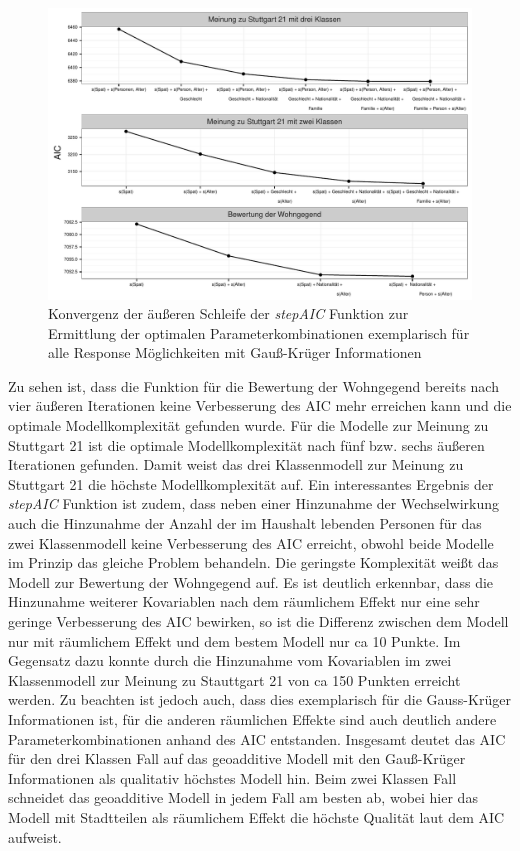 \documentclass{Vorlage}
\begin{document}
\begin{figure}[h]
 \begin{center}
 \includegraphics[scale=0.8]{Pictures/stepAIC}
 \caption{Konvergenz der äußeren Schleife der \textit{stepAIC} Funktion zur Ermittlung der optimalen Parameterkombinationen exemplarisch für alle Response Möglichkeiten mit Gauß-Krüger Informationen}
 \label{AIC}
 \end{center}
\end{figure}

Zu sehen ist, dass die Funktion für die Bewertung der Wohngegend bereits nach vier äußeren Iterationen keine Verbesserung des AIC mehr erreichen kann und die optimale Modellkomplexität gefunden wurde. Für die Modelle zur Meinung zu Stuttgart 21 ist die optimale Modellkomplexität nach fünf bzw. sechs äußeren Iterationen gefunden. Damit weist das drei Klassenmodell zur Meinung zu Stuttgart 21 die höchste Modellkomplexität auf. Ein interessantes Ergebnis der \textit{stepAIC} Funktion ist zudem, dass neben einer Hinzunahme der Wechselwirkung auch die Hinzunahme der Anzahl der im Haushalt lebenden Personen für das zwei Klassenmodell keine Verbesserung des AIC erreicht, obwohl beide Modelle im Prinzip das gleiche Problem behandeln. Die geringste Komplexität weißt das Modell zur Bewertung der Wohngegend auf. Es ist deutlich erkennbar, dass die Hinzunahme weiterer Kovariablen nach dem räumlichem Effekt nur eine sehr geringe Verbesserung des AIC bewirken, so ist die Differenz zwischen dem Modell nur mit räumlichem Effekt und dem bestem Modell nur ca 10 Punkte. Im Gegensatz dazu konnte durch die Hinzunahme vom Kovariablen im zwei Klassenmodell zur Meinung zu Stauttgart 21 von ca 150 Punkten erreicht werden. Zu beachten ist jedoch auch, dass dies exemplarisch für die Gauss-Krüger Informationen ist, für die anderen räumlichen Effekte sind auch deutlich andere Parameterkombinationen anhand des AIC entstanden.
Insgesamt deutet das AIC für den drei Klassen Fall auf das geoadditive Modell mit den Gauß-Krüger Informationen als qualitativ höchstes Modell hin. Beim zwei Klassen Fall schneidet das geoadditive Modell in jedem Fall am besten ab, wobei hier das Modell mit Stadtteilen als räumlichem Effekt die höchste Qualität laut dem AIC aufweist.
\end{document}
